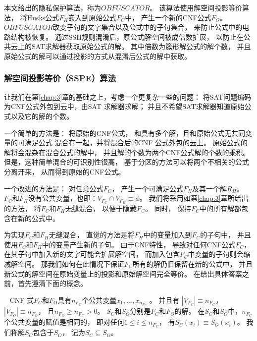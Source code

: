 本文给出的隐私保护算法，称为$OBFUSCATOR$。
该算法使用解空间投影等价算法，
将Husks公式$F_H$嵌入到原始公式$F_C$中，
产生一个新的CNF公式$F_O$。
$OBFUSCATOR$改变子句的文字集合以及公式中的子句集合，
来防止公式中的电路结构被恢复。
通过SSH规则混淆后，原公式解空间被成倍数扩展，
以防止在公共云上的SAT求解器获取原始公式的解。
其中倍数为簇形解公式的解个数，
并且原始公式的解可以通过投影的方式从混淆后公式的解中获取。

\subsubsection{解空间投影等价（SSPE）算法}\label{4:embeded rules}

让我们在第\ref{chap:3}章的基础之上，考虑一个更复杂一些的问题：
将SAT问题编码为CNF公式外包到云中，由SAT 求解器求解；
并且不希望SAT求解器知道原始公式以及它的解的个数。

一个简单的方法是：
将原始的CNF公式，
和具有多个解，且和原始公式无共同变量的可满足公式
混合在一起，并将混合后的CNF 公式外包的云上。
原始公式的解将会混杂在混合公式的解中，
并且解的个数为两个CNF公式解的个数的乘积。
但是，这种简单混合的可识别性很高，
基于分区的方法可以将两个不相关的公式分离开来，
从而得到原始的CNF公式。

一个改进的方法是：
对任意公式$F_C$，
产生一个可满足公式$F_H$及其一个解$R_H$。
$F_C$和$F_H$没有公共变量，也即：$V_{F_C}\cap V_{F_H}\equiv \phi$。
我们将采用如第\ref{chap:3}章所给出的方法，
将$F_C$和$F_H$无缝混合，
以便于隐藏$F_C$。
同时，
保持$F_C$中的所有解都包含在新的公式中。

为实现$F_C$和$F_H$无缝混合，
直觉的方法是将$F_H$中的变量加入到$F_C$的子句中，
并且使用$F_C$和$F_H$中的变量产生新的子句。
由于CNF特性，
导致对任何CNF公式$F_C$，
在其子句中加入新的文字可能会扩展解空间，
而加入包含$F_C$中变量的子句则会缩减解空间。
那我们如何在此情况下保证$F_C$所有的解仍旧保留在新的公式中，
并且新公式的解空间在原始变量上的投影和原始解空间完全等价。
在给出具体答案之前，首先澄清下面的概念。

\begin{definition}~
CNF 式$F_C$和$F_O$具有$n_{F_C}$个公共变量$x_1,...,x_{n_{F_C}}$ 。
并且有
$|V_{F_C}|\equiv n_{F_C}$，$|V_{F_O}|\equiv n_{F_O}$，
且$ n_{F_O}\geqslant n_{F_C} > 0$。
$S_C$和$S_O$分别是$F_C$和$F_O$的解。
在$S_C$和$S_O$中，$n_{F_C}$ 个公共变量的赋值是相同的，
即对任何$1\le i\le n_{F_C}$，
有$S_C(x_i)\equiv S_O(x_i)$。
我们称解$S_C$包含于$S_O$，
记为$S_C\subseteq S_O$。
\end{definition}

